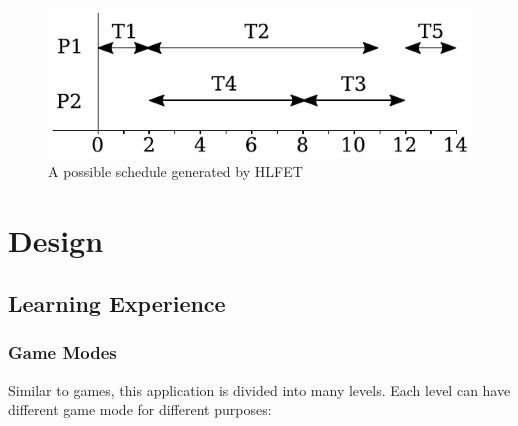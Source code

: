 \documentclass[msc,deptreport, cs]{infthesis}
\begin{document}
\begin{figure}[!htb]
  \centering
  \includegraphics[width=0.45\columnwidth]{schedule1-2.pdf}
  \caption{A possible schedule generated by HLFET}
  \label{fig:schedule1-2}
\end{figure}

\chapter{Design}

\section{Learning Experience}

\subsection{Game Modes} \label{sec:modes}

Similar to games, this application is divided into many levels. Each level can have different game mode for different purposes:
\end{document}
